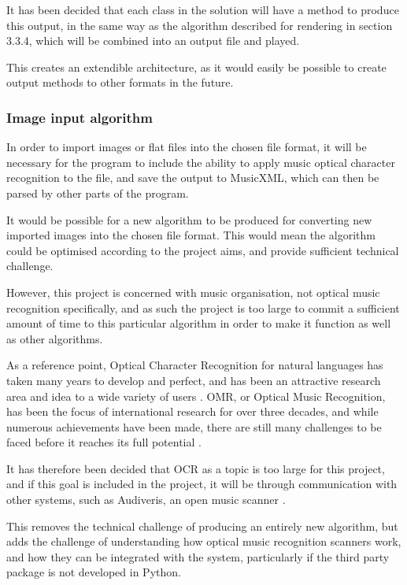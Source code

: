 It has been decided that each class in the solution will have a method to produce this output, in the same way as the algorithm described for rendering in section 3.3.4, which will be combined into an output file and played.

This creates an extendible architecture, as it would easily be possible to create output methods to other formats in the future.

\subsubsection{Image input algorithm}
In order to import images or flat files into the chosen file format, it will be necessary for the program to include the ability to apply music optical character recognition to the file, and save the output to MusicXML, which can then be parsed by other parts of the program. 

It would be possible for a new algorithm to be produced for converting new imported images into the chosen file format. This would mean the algorithm  could be optimised according to the project aims, and provide sufficient technical challenge.

However, this project is concerned with music organisation, not optical music recognition specifically, and as such the project is too large to commit a sufficient amount of time to this particular algorithm in order to make it function as well as other algorithms. 

As a reference point, Optical Character Recognition for natural languages has taken many years to develop and perfect, and has been an attractive research area and idea to a wide variety of users \parencite{InternationalConf}. OMR, or Optical Music Recognition, has been the focus of international research for over three decades, and while numerous achievements have been made, there are still many challenges to be faced before it reaches its full potential \parencite{musicocr}. 

It has therefore been decided that OCR as a topic is too large for this project, and if this goal is included in the project, it will be through communication with other systems, such as Audiveris, an open music scanner \parencite{audiveris}. 

This removes the technical challenge of producing an entirely new algorithm, but adds the challenge of understanding how optical music recognition scanners work, and how they can be integrated with the system, particularly if the third party package is not developed in Python.

